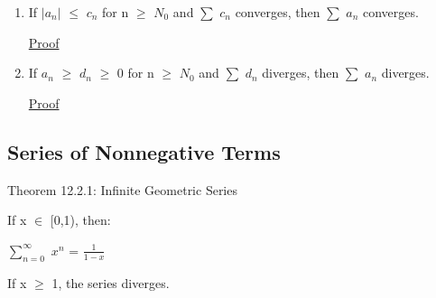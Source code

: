     \begin{enumerate}[label=(\alph*), leftmargin=2cm, itemsep=0.1cm]
        \item If $|a_n|$ $\leq$ $c_n$ for n $\geq$ $N_0$ and
        $\sum$ $c_n$ converges, then $\sum$ $a_n$ converges.

            { \color{magenta} \underline{Proof} }

        
        \item If $a_n$ $\geq$ $d_n$ $\geq$ 0 for n $\geq$ $N_0$
        and $\sum$ $d_n$ diverges, then $\sum$ $a_n$ diverges.

            { \color{magenta} \underline{Proof} }

    \end{enumerate}





\subsection{ Series of Nonnegative Terms }

{ \color{red} Theorem 12.2.1: Infinite Geometric Series }

    \begin{adjustbox}{minipage=14cm, right, vspace=0.1cm 0cm}
        If x $\in$ [0,1), then:

        \hspace{1cm}
        $\sum_{n=0}^{\infty}$ $x^n$
        = {\large $\frac{1}{1-x}$ }

        If x $\geq$ 1, the series diverges.
    \end{adjustbox}

